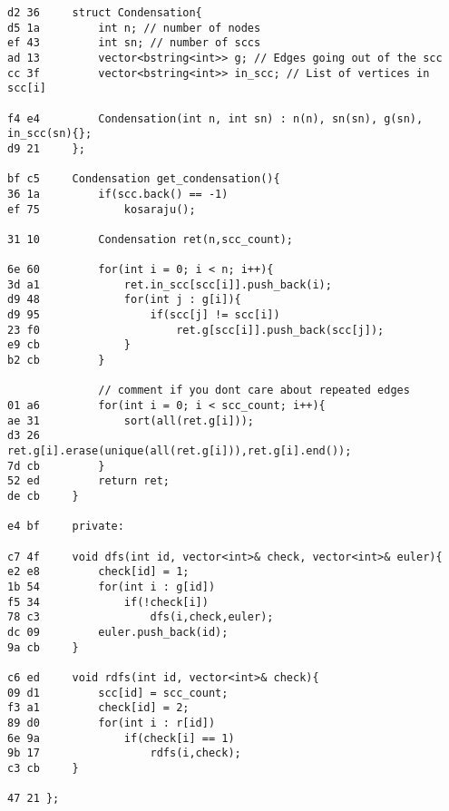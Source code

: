 \documentclass[11pt, a4paper, twoside]{article}
\begin{document}
\begin{lstlisting}
d2 36     struct Condensation{
d5 1a         int n; // number of nodes
ef 43         int sn; // number of sccs
ad 13         vector<bstring<int>> g; // Edges going out of the scc
cc 3f         vector<bstring<int>> in_scc; // List of vertices in scc[i]
      
f4 e4         Condensation(int n, int sn) : n(n), sn(sn), g(sn), in_scc(sn){};
d9 21     };
      
bf c5     Condensation get_condensation(){
36 1a         if(scc.back() == -1)
ef 75             kosaraju();
      
31 10         Condensation ret(n,scc_count);
      
6e 60         for(int i = 0; i < n; i++){
3d a1             ret.in_scc[scc[i]].push_back(i);
d9 48             for(int j : g[i]){
d9 95                 if(scc[j] != scc[i])
23 f0                     ret.g[scc[i]].push_back(scc[j]);
e9 cb             }
b2 cb         }
      
              // comment if you dont care about repeated edges
01 a6         for(int i = 0; i < scc_count; i++){
ae 31             sort(all(ret.g[i]));
d3 26             ret.g[i].erase(unique(all(ret.g[i])),ret.g[i].end());
7d cb         }
52 ed         return ret;
de cb     }
      
e4 bf     private:
      
c7 4f     void dfs(int id, vector<int>& check, vector<int>& euler){
e2 e8         check[id] = 1;
1b 54         for(int i : g[id])
f5 34             if(!check[i]) 
78 c3                 dfs(i,check,euler);
dc 09         euler.push_back(id);
9a cb     }
      
c6 ed     void rdfs(int id, vector<int>& check){
09 d1         scc[id] = scc_count;
f3 a1         check[id] = 2;
89 d0         for(int i : r[id])
6e 9a             if(check[i] == 1)
9b 17                 rdfs(i,check);
c3 cb     }
      
47 21 };
\end{lstlisting}
\end{document}
